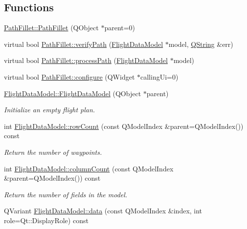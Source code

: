 \subsection*{\-Functions}
\begin{DoxyCompactItemize}
\item 
\hyperlink{group___path_ga239ceff0ba45400e38be3f6641054f4c}{\-Path\-Fillet\-::\-Path\-Fillet} (\-Q\-Object $\ast$parent=0)
\item 
virtual bool \hyperlink{group___path_gaf69499501bc26d9321cb3edaabaf8b21}{\-Path\-Fillet\-::verify\-Path} (\hyperlink{class_flight_data_model}{\-Flight\-Data\-Model} $\ast$model, \hyperlink{group___u_a_v_objects_plugin_gab9d252f49c333c94a72f97ce3105a32d}{\-Q\-String} \&err)
\item 
virtual bool \hyperlink{group___path_ga1e32689145e646e17836652d3e90067c}{\-Path\-Fillet\-::process\-Path} (\hyperlink{class_flight_data_model}{\-Flight\-Data\-Model} $\ast$model)
\item 
virtual bool \hyperlink{group___path_ga4ab477c2642c61f1169c6aa07228ec64}{\-Path\-Fillet\-::configure} (\-Q\-Widget $\ast$calling\-Ui=0)
\item 
\hyperlink{group___path_ga777bf842aa77abc4db16f1275fac0df0}{\-Flight\-Data\-Model\-::\-Flight\-Data\-Model} (\-Q\-Object $\ast$parent)
\begin{DoxyCompactList}\small\item\em \-Initialize an empty flight plan. \end{DoxyCompactList}\item 
int \hyperlink{group___path_ga7c8a098e7b8a37867261f0036502a4fc}{\-Flight\-Data\-Model\-::row\-Count} (const \-Q\-Model\-Index \&parent=\-Q\-Model\-Index()) const 
\begin{DoxyCompactList}\small\item\em \-Return the number of waypoints. \end{DoxyCompactList}\item 
int \hyperlink{group___path_gab6781580d20ed0e89768eafa799856d4}{\-Flight\-Data\-Model\-::column\-Count} (const \-Q\-Model\-Index \&parent=\-Q\-Model\-Index()) const 
\begin{DoxyCompactList}\small\item\em \-Return the number of fields in the model. \end{DoxyCompactList}\item 
\-Q\-Variant \hyperlink{group___path_ga3314e011bb5ed88b34ab33bf8f94d41e}{\-Flight\-Data\-Model\-::data} (const \-Q\-Model\-Index \&index, int role=\-Qt\-::\-Display\-Role) const 

\end{DoxyCompactItemize}
